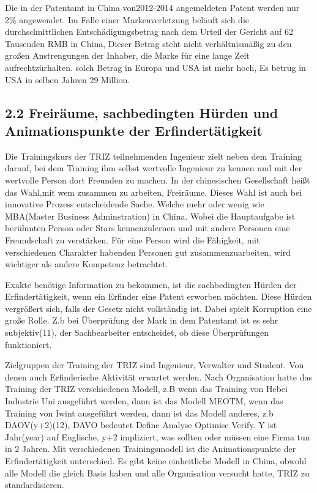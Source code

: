 \documentclass[11pt,a4paper]{article}
\begin{document}
Die in der Patentamt in China von2012-2014 angemeldeten Patent werden nur 2\%
angewendet. Im Falle einer Markenverletzung beläuft sich die
durchschnittlichen Entschädigungsbetrag nach dem Urteil der Gericht auf 62
Tausenden RMB in China, Dieser Betrag steht nicht verhältnismäßig zu den
großen Anstrengungen der Inhaber, die Marke für eine lange Zeit
aufrechtzürhalten. solch Betrag in Europa und USA ist mehr hoch, Es betrug in
USA in selben Jahren 29 Million.

\subsection{2.2 Freiräume, sachbedingten Hürden und Animationspunkte der
  Erfindertätigkeit} 

Die Trainingskurs der TRIZ teilnehmenden Ingenieur zielt neben dem Training
darauf, bei dem Training ihm selbst wertvolle Ingenieur zu kennen und mit der
wertvolle Person dort Freunden zu machen. In der chinesischen Gesellschaft
heißt das Wahl,mit wem zusammen zu arbeiten, Freiräume. Dieses Wahl ist auch
bei innovative Prozess entscheidende Sache. Welche mehr oder wenig wie
MBA(Master Business Adminstration) in China. Wobei die Hauptaufgabe ist
berühmten Person oder Stars kennenzulernen und mit andere Personen eine
Freundschaft zu verstärken. Für eine Person wird die Fähigkeit, mit
verschiedenen Charakter habenden Personen gut zusammenzuarbeiten, wird
wichtiger als andere Kompetenz betrachtet.

Exakte benötige Information zu bekommen, ist die sachbedingten Hürden der
Erfindertätigkeit, wenn ein Erfinder eine Patent erworben möchten. Diese
Hürden vergrößert sich, falls der Gesetz nicht vollständig ist. Dabei spielt
Korruption eine große Rolle. Z.b bei Überprüfung der Mark in dem Patentamt ist
es sehr subjektiv(11), der Sachbearbeiter entscheidet, ob diese Überprüfungen
funktioniert.

Zielgruppen der Training der TRIZ sind Ingenieur, Verwalter und Student. Von
denen auch Erfinderische Aktivität erwartet werden. Nach Organisation hatte
das Training der TRIZ verschiedenen Modell, z.B wenn das Training von Hebei
Industrie Uni ausgeführt werden, dann ist das Modell MEOTM, wenn das Training
von Iwint ausgeführt werden, dann ist das Modell anderes, z.b DAOV(y+2)(12),
DAVO bedeutet Define Analyse Optimise Verify.  Y ist Jahr(year) auf Englische,
y+2 impliziert, was sollten oder müssen eine Firma tun in 2 Jahren. Mit
verschiedenen Trainingsmodell ist die Animationspunkte der Erfindertätigkeit
unterschied. Es gibt keine einheitliche Modell in China, obwohl alle Modell
die gleich Basis haben und alle Organisation versucht hatte, TRIZ zu
standardisieren.
\end{document}
